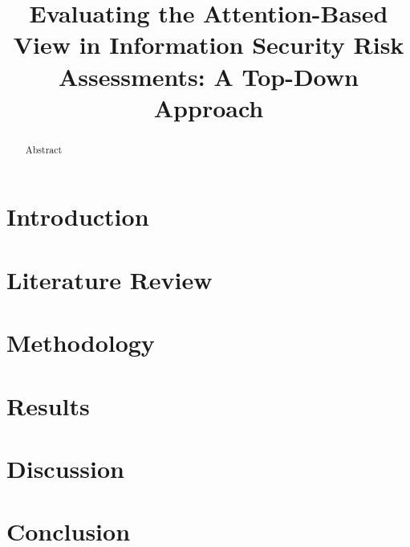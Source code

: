 \documentclass[conference]{IEEEtran}
\begin{document}
\title{Evaluating the Attention-Based View in Information Security Risk Assessments: A Top-Down Approach}

\author{
}

\maketitle

\begin{abstract}
    Abstract
\end{abstract}

\section{Introduction}

\section{Literature Review}

\section{Methodology}

\section{Results}

\section{Discussion}

\section{Conclusion}

\printbibliography

\end{document}
